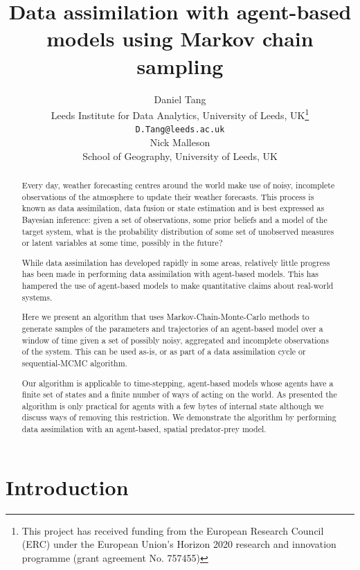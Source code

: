 \documentclass{article}
\title{Data assimilation with agent-based models using Markov chain sampling}
\author{
  Daniel Tang\\
    Leeds Institute for Data Analytics, University of Leeds, UK\thanks{This project has received funding from the European Research Council (ERC) under the European Union’s Horizon 2020 research and innovation programme (grant agreement No. 757455)}\\
  \texttt{D.Tang@leeds.ac.uk}\\
  \AND
  Nick Malleson\\
  School of Geography, University of Leeds, UK\\  
}
\begin{document}
\maketitle

\begin{abstract}
Every day, weather forecasting centres around the world make use of noisy, incomplete observations of the atmosphere to update their weather forecasts. This process is known as data assimilation, data fusion or state estimation and is best expressed as Bayesian inference: given a set of observations, some prior beliefs and a model of the target system, what is the probability distribution of some set of unobserved measures or latent variables at some time, possibly in the future?

While data assimilation has developed rapidly in some areas, relatively little progress has been made in performing data assimilation with agent-based models. This has hampered the use of agent-based models to make quantitative claims about real-world systems.

Here we present an algorithm that uses Markov-Chain-Monte-Carlo methods to generate samples of the parameters and trajectories of an agent-based model over a window of time given a set of possibly noisy, aggregated and incomplete observations of the system. This can be used as-is, or as part of a data assimilation cycle or sequential-MCMC algorithm.

Our algorithm is applicable to time-stepping, agent-based models whose agents have a finite set of states and a finite number of ways of acting on the world. As presented the algorithm is only practical for agents with a few bytes of internal state although we discuss ways of removing this restriction. We demonstrate the algorithm by performing data assimilation with an agent-based, spatial predator-prey model.
\end{abstract}


\section{Introduction}
\end{document}
